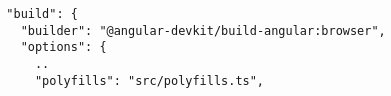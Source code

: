 \begin{verbatim}
  "build": {
    "builder": "@angular-devkit/build-angular:browser",
    "options": {
      ..
      "polyfills": "src/polyfills.ts",
\end{verbatim}
